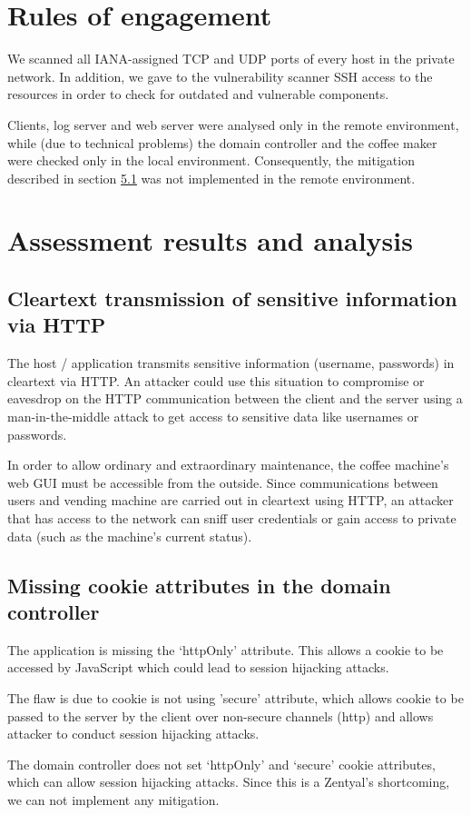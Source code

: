 \documentclass{homework}
\begin{document}
    
    \section{Rules of engagement}
    We scanned all IANA-assigned TCP and UDP ports of every host in the private network.
    In addition, we gave to the vulnerability scanner SSH access to the resources in order to check for outdated and vulnerable components.
    
    Clients, log server and web server were analysed only in the remote environment, while (due to technical problems) the domain controller and the coffee maker were checked only in the local environment.
    Consequently, the mitigation described in section \hyperref[sec:http-mitigation]{5.1} was not implemented in the remote environment.
    
    
    \section{Assessment results and analysis}
    \subsection{Cleartext transmission of sensitive information via HTTP}
    \begin{displayquote}
        The host / application transmits sensitive information (username, passwords) in cleartext via HTTP.
        \textelp{}
        An attacker could use this situation to compromise or eavesdrop on the HTTP communication between the client and the server using a man-in-the-middle attack to get access to sensitive data like usernames or passwords.
    \end{displayquote}
    In order to allow ordinary and extraordinary maintenance, the coffee machine's web GUI must be accessible from the outside.
    Since communications between users and vending machine are carried out in cleartext using HTTP, an attacker that has access to the network can sniff user credentials or gain access to private data (such as the machine's current status).
    
    \subsection{Missing cookie attributes in the domain controller}
    \begin{displayquote}
        The application is missing the `httpOnly' attribute.
        \textelp{}
        This allows a cookie to be accessed by JavaScript which could lead to session hijacking attacks.
    \end{displayquote}
    \begin{displayquote}
        The flaw is due to cookie is not using 'secure' attribute, which allows cookie to be passed to the server by the client over non-secure channels (http) and allows attacker to conduct session hijacking attacks.
    \end{displayquote}
    The domain controller does not set `httpOnly' and `secure' cookie attributes, which can allow session hijacking attacks.
    Since this is a Zentyal's shortcoming, we can not implement any mitigation.
    
\end{document}
